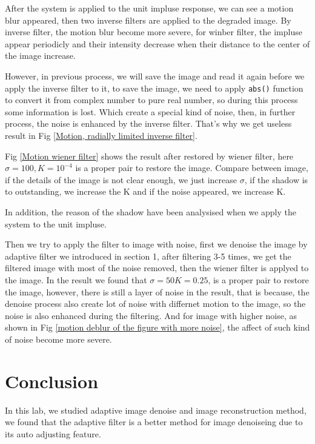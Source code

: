 \documentclass[
	12pt, %
]{style/fphw}
\begin{document}
After the system is applied to the unit impluse response, we can see a motion blur appeared, then two inverse filters are applied to the degraded image. By inverse filter, the motion blur become more severe, for winber filter, the impluse appear periodicly and their intensity decrease when their distance to the center of the image increase.

However, in previous process, we will save the image and read it again before we apply the inverse filter to it, to save the image, we need to apply \texttt{abs()} function to convert it from complex number to pure real number, so during this process some information is lost. Which create a special kind of noise, then, in further process, the noise is enhanced by the inverse filter. That's why we get useless result in Fig \ref{Motion, radially limited inverse filter}.

Fig \ref{Motion wiener filter} shows the result after restored by wiener filter, here $\sigma = 100, K = 10^{-4}$ is a proper pair to restore the image. Compare between image, if the details of the image is not clear enough, we just increase $\sigma$, if the shadow is to outstanding, we increase the K and if the noise appeared, we increase K.

In addition, the reason of the shadow have been analysised when we apply the system to the unit impluse.

Then we try to apply the filter to image with noise, first we denoise the image by adaptive filter we introduced in section 1, after filtering 3-5 times, we get the filtered image with most of the noise removed, then the wiener filter is applyed to the image. In the result we found that $\sigma =50 K =0.25$, is a proper pair to restore the image, however, there is still a layer of noise in the result, that is because, the denoise process also create lot of noise with differnet motion to the image, so the noise is also enhanced during the filtering. And for image with higher noise, as shown in Fig \ref{motion deblur of the figure with more noise}, the affect of such kind of noise become more severe.


\section*{Conclusion}

In this lab, we studied adaptive image denoise and image reconstruction method, we found that the adaptive filter is a better method for image denoiseing due to its auto adjusting feature. 
\end{document}

